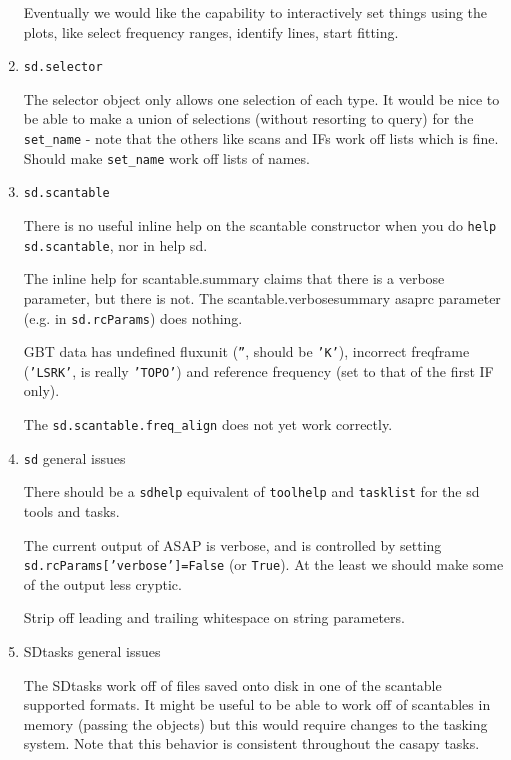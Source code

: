 \begin{enumerate}
  Eventually we would like the capability to interactively set things
  using the plots, like select frequency ranges, identify lines,
  start fitting.

\item {\tt sd.selector}

  The selector object only allows one selection of each type.  It would be 
  nice to be able to make a union of selections (without resorting to query)
  for the {\tt set\_name} - note that the others like scans and IFs work off
  lists which is fine.  Should make {\tt set\_name} work off lists of names.

\item {\tt sd.scantable}

  There is no useful inline help on the scantable constructor
  when you do {\tt help sd.scantable}, nor in {help sd}.

  The inline help for scantable.summary claims that there is
  a verbose parameter, but there is not.  The scantable.verbosesummary
  asaprc parameter (e.g. in {\tt sd.rcParams}) does nothing.

  GBT data has undefined fluxunit ({\tt ''}, should be {\tt 'K'}), 
  incorrect freqframe ({\tt 'LSRK'}, is really {\tt 'TOPO'}) and reference
  frequency (set to that of the first IF only).


  The {\tt sd.scantable.freq\_align} does not yet work correctly.


\item {\tt sd} general issues

  There should be a {\tt sdhelp} equivalent of {\tt toolhelp}
  and {\tt tasklist} for the sd tools and tasks.

  The current output of ASAP is verbose, and is controlled by
  setting {\tt sd.rcParams['verbose']=False} (or {\tt True}).
  At the least we should make some of the output less cryptic.

  Strip off leading and trailing whitespace on string parameters.

\item SDtasks general issues

  The SDtasks work off of files saved onto disk in one of the 
  scantable supported formats.  It might be useful to be able to
  work off of scantables in memory (passing the objects) but this
  would require changes to the tasking system.  Note that this
  behavior is consistent throughout the casapy tasks.



\end{enumerate}
